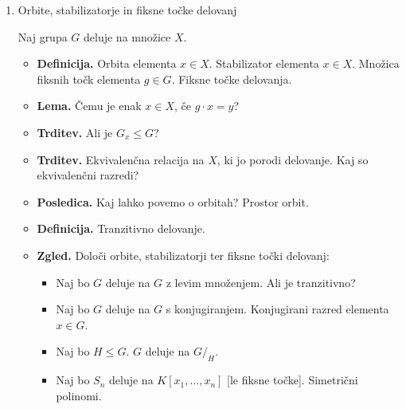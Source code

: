 \begin{enumerate}
    \item Orbite, stabilizatorje in fiksne točke delovanj
    
    Naj grupa \(G\) deluje na množice \(X\).
    \begin{itemize}
        \item \textbf{Definicija.} Orbita elementa \(x \in X\). Stabilizator elementa \(x \in X\). Množica fiksnih točk elementa \(g \in G\). Fiksne točke delovanja.
        \item \textbf{Lema.} Čemu je enak \(x \in X\), če \(g \cdot x = y\)?
        \item \textbf{Trditev.} Ali je \(G_x \leq G\)?
        \item \textbf{Trditev.} Ekvivalenčna relacija na \(X\), ki jo porodi delovanje. Kaj so ekvivalenčni razredi?
        \item \textbf{Posledica.} Kaj lahko povemo o orbitah? Prostor orbit.
        \item \textbf{Definicija.} Tranzitivno delovanje.
        \item \textbf{Zgled.} Določi orbite, stabilizatorji ter fiksne točki delovanj:
        \begin{itemize}
            \item Naj bo \(G\) deluje na \(G\) z levim množenjem. Ali je tranzitivno?
            \item Naj bo \(G\) deluje na \(G\) s konjugiranjem. Konjugirani razred elementa \(x \in G\).
            \item Naj bo \(H \leq G\). \(G\) deluje na \(G/_H\).
            \item Naj bo \(S_n\) deluje na \(K[x_1, \ldots, x_n]\) [le fiksne točke]. Simetrični polinomi.
        \end{itemize}
    \end{itemize}
\end{enumerate}